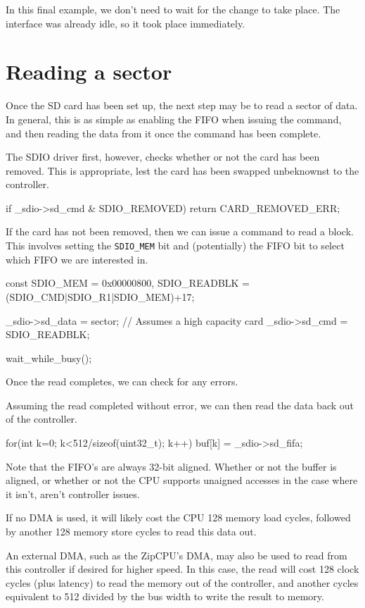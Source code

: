 \documentclass{gqtekspec}
\begin{document}
In this final example, we don't need to wait for the change to take place.
The interface was already idle, so it took place immediately.
\section{Reading a sector}
Once the SD card has been set up, the next step may be to read a sector
of data.  In general, this is as simple as enabling the FIFO when issuing
the command, and then reading the data from it once the command has been
complete.

The SDIO driver first, however, checks whether or not the card has been
removed.  This is appropriate, lest the card has been swapped unbeknownst
to the controller.
\begin{zCpp}
	if _sdio->sd_cmd & SDIO_REMOVED)
		return CARD_REMOVED_ERR;
\end{zCpp}

If the card has not been removed, then we can issue a command to read a
block.  This involves setting the {\tt SDIO\_MEM} bit and (potentially) the
FIFO bit to select which FIFO we are interested in.
\begin{zCpp}
	const	SDIO_MEM     = 0x00000800,
		SDIO_READBLK = (SDIO_CMD|SDIO_R1|SDIO_MEM)+17;

	_sdio->sd_data = sector;	// Assumes a high capacity card
	_sdio->sd_cmd = SDIO_READBLK;

	wait_while_busy();
\end{zCpp}

Once the read completes, we can check for any errors.

Assuming the read completed without error, we can then read the data back
out of the controller.

\begin{zCpp}
	for(int k=0; k<512/sizeof(uint32_t); k++)
		buf[k] = _sdio->sd_fifa;
\end{zCpp}

Note that the FIFO's are always 32-bit aligned.  Whether or not the buffer
is aligned, or whether or not the CPU supports unaigned accesses in the
case where it isn't, aren't controller issues.

If no DMA is used, it will likely cost the CPU 128 memory load cycles, followed
by another 128 memory store cycles to read this data out.

An external DMA, such as the ZipCPU's DMA, may also be used to read from this
controller if desired for higher speed.  In this case, the read will cost 128
clock cycles (plus latency) to read the memory out of the controller, and
another cycles equivalent to 512 divided by the bus width to write the result
to memory.
\end{document}
